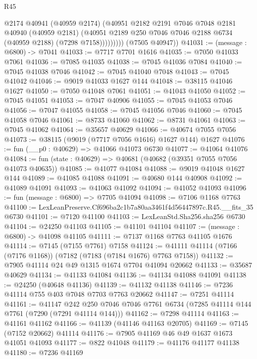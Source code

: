 \begin{lexlean}{R45}
\begin{coremodule}
{                  @2174
                  @40941
                  (@40959 @2174)
                  (@40951
                    @2182
                    @2191
                    @7046
                    @7048
                    @2181
                    @40940
                    (@40959 @2181)
                    (@40951 @2189 @250 @7046 @7046 @2188 @6734 (@40959 @2188) (@7298 @7158)))))))))
      (@7505 @40947))
@41031 := (message : @6800) -> @7041
@41033 := @7717 @7701 @1616
@41035 := @7050 @41033 @7061
@41036 := @7085 @41035
@41038 := @7045 @41036 @7084
@41040 := @7045 @41038 @7046
@41042 := @7045 @41040 @7048
@41043 := @7045 @41042
@41046 := @9019 @41033 @1627 @144
@41048 := @38115 @41046 @1627
@41050 := @7050 @41048 @7061
@41051 := @41043 @41050
@41052 := @7045 @41051
@41053 := @7047 @40906
@41055 := @7045 @41053 @7046
@41056 := @7047 @41055
@41058 := @7045 @41056 @7046
@41060 := @7045 @41058 @7046
@41061 := @8733 @41060
@41062 := @8731 @41061
@41063 := @7045 @41062
@41064 := @35657 @40629
@41066 := @40674 @7055 @7056
@41073 := @38115 (@9019 (@7717 @7056 @1616) @1627 @144) @1627
@41076 := fun (__p0 : @40629) => @41066 @41073 @6730
@41077 := @41064 @41076
@41084 := fun (state : @40629) => @40681 (@40682 (@39351 @7055 @7056 @41073 @40635))
@41085 := @41077 @41084
@41088 := @9019 @41048 @1627 @144
@41089 := @41085 @41088
@41091 := @40680 @144 @40908
@41092 := @41089 @41091
@41093 := @41063 @41092
@41094 := @41052 @41093
@41096 := fun (message : @6800) => @7705 @41094
@41098 := @7106 @1168 @7763
@41100 := LexLeanPreserve.Cf696ba2c1b7a80aa3461f4d56447897c.R45.__fits_35 @6730
@41101 := @7120 @41100
@41103 := LexLeanStd.Sha256.sha256 @6730
@41104 := @24250 @41103
@41105 := @41101 @41104
@41107 := (message : @6800) -> @41098 @41105
@41111 := @7137 @1168 @7763 @41105 @1676
@41114 := @7145 (@7155 @7761) @7158
@41124 := @41111 @41114 (@7166 (@7176 @1168)) (@7182 (@7183 (@7184 @1676) @7763 @7158))
@41132 := @7905 @41114 @24 @49 @1315 @1674 @7704 @41094 @20662
@41133 := @35687 @40629
@41134 := @41133 @41084
@41136 := @41134 @41088 @41091
@41138 := @24250 (@40648 @41136)
@41139 := @41132 @41138
@41146 := @7236 @41114 @755 @403 @7048 @7703 @7763 @20662
@41147 := @7251 @41114
@41161 := @41147
    @242
    @250
    @7046
    @7046
    @7761
    @6734
    (@7285 @41114 @144 @7761 (@7290 (@7291 @41114 @144)))
@41162 := @7298 @41114
@41163 := @41161 @41162
@41166 := @41139 (@41146 @41163 @20705)
@41169 := @7145 (@7152 @20662) @41114
@41176 := @7905 @41169 @46 @49 @1637 @1673 @41051 @41093
@41177 := @822 @41048
@41179 := @41176 @41177 @41138
@41180 := @7236 @41169
}
\end{coremodule}
\end{lexlean}
